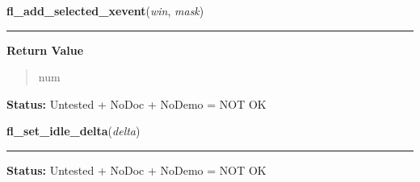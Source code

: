     \label{xformslib:library:fl_addto_selected_xevent}

    \vspace{0.5ex}

\hspace{.8\funcindent}\begin{boxedminipage}{\funcwidth}

    \raggedright \textbf{fl\_add\_selected\_xevent}(\textit{win}, \textit{mask})

    \vspace{-1.5ex}

    \rule{\textwidth}{0.5\fboxrule}
\setlength{\parskip}{2ex}
\setlength{\parskip}{1ex}
      \textbf{Return Value}
    \vspace{-1ex}

      \begin{quote}
      num

      \end{quote}

\textbf{Status:} Untested + NoDoc + NoDemo = NOT OK



    \end{boxedminipage}

    \label{xformslib:library:fl_set_idle_delta}

    \vspace{0.5ex}

\hspace{.8\funcindent}\begin{boxedminipage}{\funcwidth}

    \raggedright \textbf{fl\_set\_idle\_delta}(\textit{delta})

    \vspace{-1.5ex}

    \rule{\textwidth}{0.5\fboxrule}
\setlength{\parskip}{2ex}
\setlength{\parskip}{1ex}
\textbf{Status:} Untested + NoDoc + NoDemo = NOT OK



    \end{boxedminipage}

    \label{xformslib:library:fl_add_event_callback}

